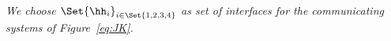  
 \begin{example}
 {\em  We choose $\Set{\hh_i}_{i\in \Set{1,2,3,4}}$ as set of interfaces for the communicating systems of Figure~\ref{eq:JK}.\finex} 
 \end{example}

\smallskip

 

%
%
